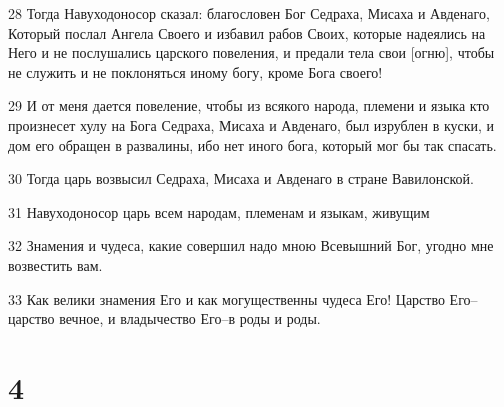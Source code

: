 \par 28 Тогда Навуходоносор сказал: благословен Бог Седраха, Мисаха и Авденаго,  Который послал Ангела Своего  и избавил рабов Своих,  которые надеялись на Него и не послушались царского повеления, и предали тела свои [огню], чтобы не служить и не поклоняться иному богу, кроме Бога своего!
\par 29 И от меня дается повеление, чтобы из всякого народа, племени и языка кто произнесет хулу на Бога Седраха, Мисаха и Авденаго, был изрублен в куски, и дом его обращен в развалины, ибо нет иного бога, который мог бы так спасать.
\par 30 Тогда царь возвысил Седраха, Мисаха и Авденаго в стране Вавилонской.
\par 31 Навуходоносор царь всем народам, племенам и языкам, живущим
\par 32 Знамения и чудеса, какие совершил надо мною Всевышний Бог, угодно мне возвестить вам.
\par 33 Как велики знамения Его и как могущественны чудеса Его! Царство Его--царство вечное, и владычество Его--в роды и роды.

\chapter{4}

